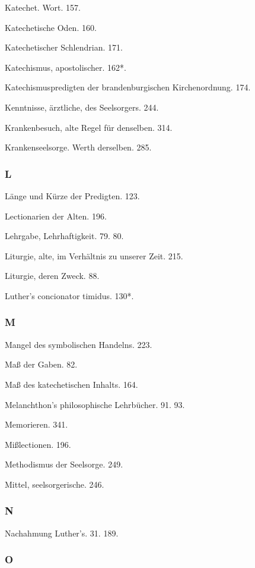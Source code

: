 Katechet. Wort. 157.

Katechetische Oden. 160.

Katechetischer Schlendrian. 171.

Katechismus, apostolischer. 162*.

Katechismuspredigten der brandenburgischen Kirchenordnung. 174.

Kenntnisse, ärztliche, des Seelsorgers. 244.

Krankenbesuch, alte Regel für denselben. 314.

Krankenseelsorge. Werth derselben. 285.

\subsubsection{L}

Länge und Kürze der Predigten. 123.

Lectionarien der Alten. 196.

Lehrgabe, Lehrhaftigkeit. 79. 80.

Liturgie, alte, im Verhältnis zu unserer Zeit. 215.

Liturgie, deren Zweck. 88.

Luther’s concionator timidus. 130*.

\subsubsection{M}

Mangel des symbolischen Handelns. 223.

Maß der Gaben. 82.

Maß des katechetischen Inhalts. 164.

Melanchthon’s philosophische Lehrbücher. 91. 93.

Memorieren. 341.

Mißlectionen. 196.

Methodismus der Seelsorge. 249.

Mittel, seelsorgerische. 246.

\subsubsection{N}

Nachahmung Luther’s. 31. 189.

\subsubsection{O}

